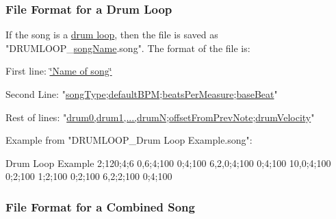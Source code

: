 \hypertarget{group___song_group_DocSongFileFormatDrumLoop}{}\subsubsection{File Format for a Drum Loop}\label{group___song_group_DocSongFileFormatDrumLoop}
If the song is a \hyperlink{group___song_group_DocSongDrumLoop}{drum loop}, then the file is saved as "D\+R\+U\+M\+L\+O\+O\+P\+\_\+\hyperlink{group___song_priv_var_ga6a5e6c1e4aa92939e2b5c1e3d9908df8}{song\+Name}.song". The format of the file is\+: \begin{DoxyItemize}
\item First line\+: \hyperlink{group___song_priv_var_ga6a5e6c1e4aa92939e2b5c1e3d9908df8}{\char`\"{}\+Name of song\char`\"{}} \item Second Line\+: "\hyperlink{group___song_enums_gae681a1f001333e39fc1cb4fea97bfe1b}{song\+Type};\hyperlink{group___audio_DefBPM}{default\+B\+PM};\hyperlink{group___music_structs_acda79d249e7a1974a152832a881e9f0b}{beats\+Per\+Measure};\hyperlink{group___music_structs_aaf5b010a2541959c26f96630db042ee8}{base\+Beat}" \item Rest of lines\+: "\hyperlink{group___music_structs_a11ba5b49d8ee25941337573029660f25}{drum0,drum1,...,drumN};\hyperlink{group___music_structs_ae281187907aed4c728c7981300dbebaf}{offset\+From\+Prev\+Note};\hyperlink{group___music_structs_a98181a53f924736c2df08f886cffed7d}{drum\+Velocity}" \item Example from "D\+R\+U\+M\+L\+O\+O\+P\+\_\+\+Drum Loop Example.\+song"\+: \begin{DoxyVerb}Drum Loop Example
2;120;4;6
0,6;4;100
0;4;100
6,2,0;4;100
0;4;100
10,0;4;100
0;2;100
1;2;100
0;2;100
6,2;2;100
0;4;100
\end{DoxyVerb}
\end{DoxyItemize}
\hypertarget{group___song_group_DocSongFileFormatCombined}{}\subsubsection{File Format for a Combined Song}\label{group___song_group_DocSongFileFormatCombined}
